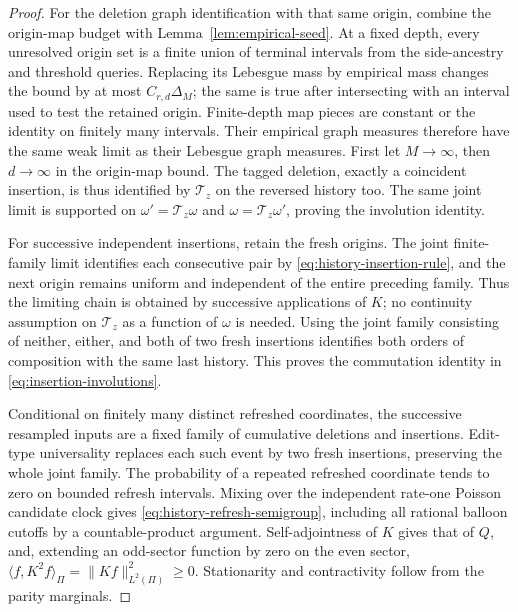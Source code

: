 \documentclass[11pt,letterpaper]{article}
\begin{document}
\begin{proof}
For the deletion graph identification with that same origin, combine
the origin-map budget with Lemma~\ref{lem:empirical-seed}.
At a fixed depth, every unresolved origin set is a finite union of
terminal intervals from the side-ancestry and threshold queries.
Replacing its Lebesgue mass by empirical mass changes the bound by
at most $C_{r,d}\Delta_M$; the same is true after intersecting with
an interval used to test the retained origin. Finite-depth map
pieces are constant or the identity on finitely many intervals.
Their empirical graph measures therefore have the same weak limit
as their Lebesgue graph measures. First let $M\to\infty$, then
$d\to\infty$ in the origin-map bound. The tagged deletion, exactly
a coincident insertion, is thus identified by
$\mathcal T_z$ on the reversed history too. The same joint limit is
supported on $\omega'=\mathcal T_z\omega$ and
$\omega=\mathcal T_z\omega'$, proving the involution identity.

For successive independent insertions, retain the fresh origins.
The joint finite-family limit identifies each consecutive pair by
\eqref{eq:history-insertion-rule}, and the next origin remains uniform
and independent of the entire preceding family. Thus the limiting
chain is obtained by successive applications of $K$; no continuity
assumption on $\mathcal T_z$ as a function of $\omega$ is needed.
Using the joint family consisting of neither, either, and both of two
fresh insertions identifies both orders of composition with the same
last history. This proves the commutation identity in
\eqref{eq:insertion-involutions}.

Conditional on finitely many distinct refreshed coordinates, the
successive resampled inputs are a fixed family of cumulative deletions
and insertions. Edit-type universality replaces each such event by two
fresh insertions, preserving the whole joint family. The probability
of a repeated refreshed coordinate tends to zero on bounded refresh
intervals. Mixing over the independent rate-one Poisson candidate
clock gives \eqref{eq:history-refresh-semigroup}, including all rational
balloon cutoffs by a countable-product argument.
Self-adjointness of $K$ gives that of $Q$, and, extending an odd-sector
function by zero on the even sector,
$\langle f,K^2f\rangle_\Pi=\|Kf\|_{L^2(\Pi)}^2\ge0$.
Stationarity and contractivity follow from the parity marginals.
\end{proof}
\end{document}
